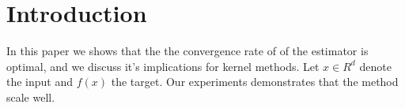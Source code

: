 \documentclass{article}
\begin{document}
\section{Introduction}
In this paper we shows that the the convergence rate of of the estimator
is optimal, and we discuss it's implications for kernel methods. Let $x \in R^d$ denote the input and $f(x)$ the target.
Our experiments demonstrates that the method scale well.
\end{document}
